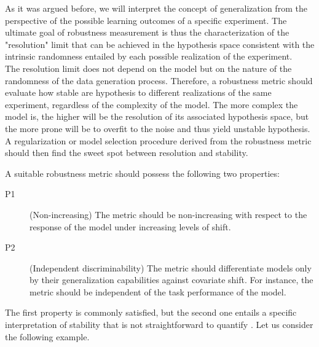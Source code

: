 As it was argued before, we will 
interpret the concept of generalization from the 
perspective of the possible learning outcomes
of a specific experiment. The ultimate goal 
of robustness measurement is thus the characterization of the "resolution" 
limit that can be achieved in the hypothesis space 
consistent with the intrinsic randomness entailed by each 
possible realization of the experiment. \\

The resolution limit does not depend on the model but on the 
nature of the randomness of the data generation process. 
Therefore, a robustness metric should evaluate how stable are hypothesis 
to different realizations of the same experiment, regardless 
of the complexity of the model. The more 
complex the model is, the higher will be the resolution of its
associated hypothesis space, but the more prone will be to overfit
to the noise and thus yield unstable hypothesis. A regularization 
or model selection procedure derived from the robustness metric 
should then find the sweet spot between resolution and stability. \\

\begin{properties}\label{properties:robustness}
    A suitable robustness metric should possess the following two properties:
\begin{description}
    \item[P1](Non-increasing) The metric should be non-increasing with respect to the
    response of the model under increasing levels of shift.
    \item[P2](Independent discriminability) The metric should differentiate models only by their generalization capabilities against 
    covariate shift. For instance, the metric should be independent of the task
    performance of the model.
\end{description}
\end{properties}

The first property is commonly satisfied, but the second one entails
a specific interpretation of stability that is not straightforward to
quantify \cite{buhmannPosteriorAgreementModel2022}. Let us consider
the following example.

